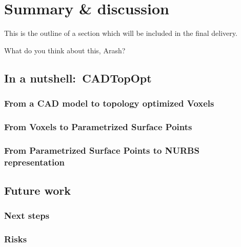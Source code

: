 \chapter{Summary \& discussion}
This is the outline of a section which will be included in the final delivery. 

What do you think about this, Arash?
\label{chapter:Discussion}

\section{In a nutshell:\ \acl{CADTopOpt}}
\subsection{From a \acs{CAD} model to topology optimized Voxels}
\subsection{From Voxels to Parametrized Surface Points}
\subsection{From Parametrized Surface Points to \ac{NURBS} representation}

\section{Future work}
\subsection{Next steps}
\subsection{Risks}
